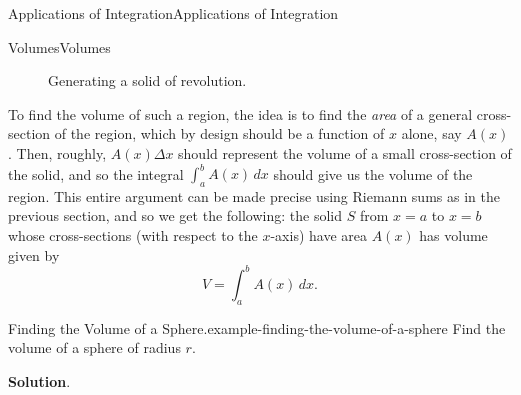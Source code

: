 \documentclass[10pt,]{book}
\numberwithin{equation}{section}
\begin{document}
\begin{chapterptx}{Applications of Integration}{}{Applications of Integration}{}{}
\begin{sectionptx}{Volumes}{}{Volumes}{}{}
\begin{figure}
\begin{sidebyside}{2}{0}{0}{0}
\begin{sbspanel}{0.5}
{{\begin{tikzpicture}
\end{tikzpicture}
}
}
\end{sbspanel}%
\begin{sbspanel}{0.5}%
\end{sbspanel}%
\end{sidebyside}%
\caption{Generating a solid of revolution.\label{figure-solid-revolution-1}}
\end{figure}
\hypertarget{p-629}{}%
To find the volume of such a region, the idea is to find the \emph{area} of a general cross-section of the region, which by design should be a function of \(x\) alone, say \(A(x)\). Then, roughly, \(A(x)\Delta x\) should represent the volume of a small cross-section of the solid, and so the integral \(\int_{a}^{b}A(x)\,dx\) should give us the volume of the region. This entire argument can be made precise using Riemann sums as in the previous section, and so we get the following: the solid \(S\) from \(x = a\) to \(x = b\) whose cross-sections (with respect to the \(x\)-axis) have area \(A(x)\) has volume given by%
\begin{equation}
V = \int_{a}^{b}A(x)\,dx.\label{equation-solid-revolution-volume}
\end{equation}
%
\begin{example}{Finding the Volume of a Sphere.}{example-finding-the-volume-of-a-sphere}%
\hypertarget{p-630}{}%
Find the volume of a sphere of radius \(r\).%
\par\smallskip%
\noindent\textbf{Solution}.\hypertarget{solution-137}{}\quad%

\end{example}
\end{sectionptx}
\end{chapterptx}
\end{document}
